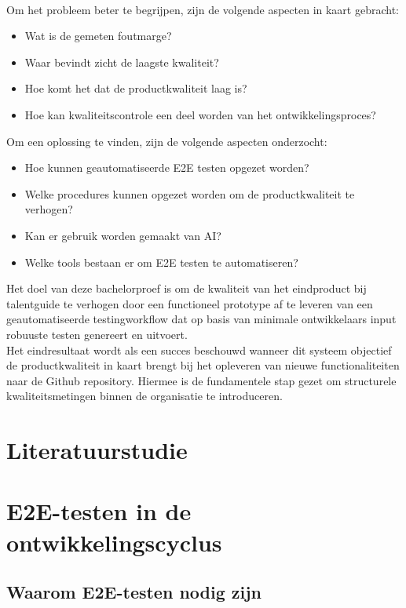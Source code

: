 \\
Om het probleem beter te begrijpen, zijn de volgende aspecten in kaart gebracht:
\begin{itemize}
    \item Wat is de gemeten foutmarge?
    \item Waar bevindt zicht de laagste kwaliteit?
    \item Hoe komt het dat de productkwaliteit laag is?
    \item Hoe kan kwaliteitscontrole een deel worden van het ontwikkelingsproces?
\end{itemize}
\bigskip
Om een oplossing te vinden, zijn de volgende aspecten onderzocht:
\begin{itemize}
    \item Hoe kunnen geautomatiseerde E2E testen opgezet worden?
    \item Welke procedures kunnen opgezet worden om de productkwaliteit te verhogen?
    \item Kan er gebruik worden gemaakt van AI?
    \item Welke tools bestaan er om E2E testen te automatiseren?
\end{itemize}
\bigskip
Het doel van deze bachelorproef is om de kwaliteit van het eindproduct bij talentguide te verhogen door een functioneel prototype af te leveren van een geautomatiseerde testingworkflow dat op basis van minimale ontwikkelaars input robuuste testen genereert en uitvoert.
\bigskip
\\
Het eindresultaat wordt als een succes beschouwd wanneer dit systeem objectief de productkwaliteit in kaart brengt bij het opleveren van nieuwe functionaliteiten naar de Github repository. Hiermee is de fundamentele stap gezet om structurele kwaliteitsmetingen binnen de organisatie te introduceren.



\section{Literatuurstudie}%
\label{sec:literatuurstudie}

\section{E2E-testen in de ontwikkelingscyclus}

\subsection{Waarom E2E-testen nodig zijn}


